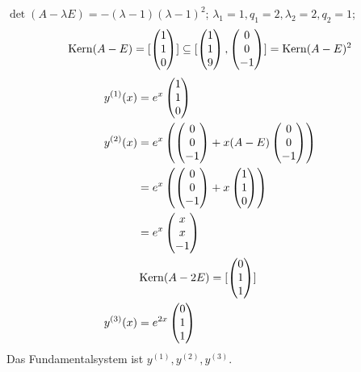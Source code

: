 \documentclass[a4paper,twoside,DIV15,BCOR12mm]{scrbook}
\begin{document}
\begin{beispiele}
$\det(A-\lambda E) = -(\lambda-1)(\lambda-1)^2$; $\lambda_1 = 1, q_1=2, \lambda_2=2, q_2 = 1$; 
\[\mathop{\mathrm{Kern}}\nolimits(A-E)= [
\begin{pmatrix}
1\\1\\0
\end{pmatrix}] \subseteq [
\begin{pmatrix}
1\\1\\9
\end{pmatrix} , 
\begin{pmatrix}
0\\0\\-1
\end{pmatrix}] = \mathop{\mathrm{Kern}}\nolimits (A-E)^2\]
\begin{align*}
y^{(1)}(x) &= e^x
\begin{pmatrix}
1\\1\\0
\end{pmatrix} \\
y^{(2)}(x) &= e^x\left(
\begin{pmatrix}
0\\0\\-1
\end{pmatrix} + x(A-E)
\begin{pmatrix}
0\\0\\-1
\end{pmatrix}\right) \\
&= e^x\left(
\begin{pmatrix}
0\\0\\-1
\end{pmatrix} + x
\begin{pmatrix}
1\\1\\0
\end{pmatrix}\right) \\
&= e^x
\begin{pmatrix}
x\\x\\-1
\end{pmatrix}\\
& \mathop{\mathrm{Kern}}\nolimits(A-2E) = [
\begin{pmatrix}
0\\1\\1
\end{pmatrix}] \\
y^{(3)}(x) &= e^{2x}
\begin{pmatrix}
0\\1\\1
\end{pmatrix}
\end{align*}
Das Fundamentalsystem ist $y^{(1)}, y^{(2)}, y^{(3)}$.


\end{beispiele}
\end{document}
